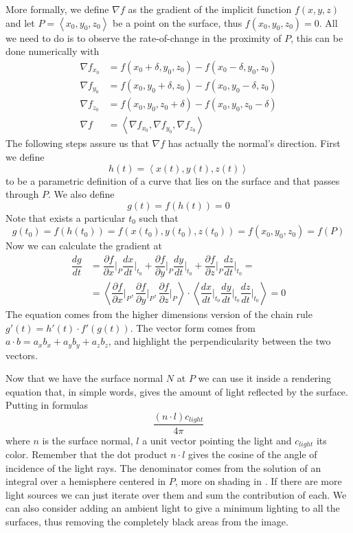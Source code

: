 More formally, we define $\nabla f$ as the gradient of the implicit function $f(x,y,z)$ and let $P = \left< x_0, y_0, z_0 \right>$ be a point on the surface, thus $f(x_0, y_0, z_0) = 0$.
All we need to do is to observe the rate-of-change in the proximity of $P$,
this can be done numerically with 
\begin{align*}
  \nabla f_{x_0} &= f(x_0+\delta, y_0       , z_0       ) - f(x_0-\delta, y_0       , z_0)\\
  \nabla f_{y_0} &= f(x_0       , y_0+\delta, z_0       ) - f(x_0       , y_0-\delta, z_0)\\
  \nabla f_{z_0} &= f(x_0       , y_0       , z_0+\delta) - f(x_0       , y_0       , z_0-\delta)\\
  \nabla f   &= \left< \nabla f_{x_0}, \nabla f_{y_0}, \nabla f_{z_0} \right>
\end{align*}
The following steps assure us that $\nabla f$ has actually the normal's direction.
First we define
$$h(t) = \left< x(t), y(t), z(t) \right>$$
to be a parametric definition of a curve that lies on the surface and that passes through $P$.
We also define 
$$g(t) = f(h(t)) = 0$$
Note that exists a particular $t_0$ such that
$$g(t_0) = f(h(t_0)) = f(x(t_0), y(t_0), z(t_0)) = f(x_0, y_0, z_0) = f(P)$$ %
Now we can calculate the gradient at 
\begin{align*}
  \dfrac{dg}{dt} &=
\dfrac {\partial f} {\partial x} \bigg\rvert_{P} \dfrac {d x} {d t} \bigg\rvert_{t_0} + \dfrac {\partial f} {\partial y} \bigg\rvert_{P}\dfrac {d y} {d t} \bigg\rvert_{t_0} + \dfrac {\partial f} {\partial z} \bigg\rvert_{P}\dfrac {d z} {d t} \bigg\rvert_{t_0}
=\\
                 &= \left< \dfrac {\partial f} {\partial x} \bigg\rvert_{P}, \dfrac {\partial f} {\partial y} \bigg\rvert_{P}, \dfrac {\partial f} {\partial z} \bigg\rvert_{P} \right> \cdot \left<  \dfrac {d x} {d t} \bigg\rvert_{t_0}  \dfrac {d y} {d t} \bigg\rvert_{t_0}  \dfrac {d z} {d t} \bigg\rvert_{t_0} \right> = 0 %
\end{align*}
The equation comes from the higher dimensions version of the chain rule $g'(t) = h'(t) \cdot f'(g(t))$.
The vector form comes from $a \cdot b = a_x b_x + a_y b_y + a_z b_z$, and highlight the perpendicularity between the two vectors.

Now that we have the surface normal $N$ at $P$ we can use it inside a rendering equation that, in simple words, gives the amount of light reflected by the surface.
Putting in formulas
$$
\dfrac{ (n \cdot l) c_{light} }
{ 4 \pi }
$$
where $n$ is the surface normal, $l$ a unit vector pointing the light and $c_{light}$ its color.
Remember that the dot product $n \cdot l$ gives the cosine of the angle of incidence of the light rays.
The denominator comes from the solution of an integral over a hemisphere centered in $P$, more on shading in \cite{real_time_rendering}.
If there are more light sources we can just iterate over them and sum the contribution of each.
We can also consider adding an ambient light to give a minimum lighting to all the surfaces, thus removing the completely black areas from the image.


